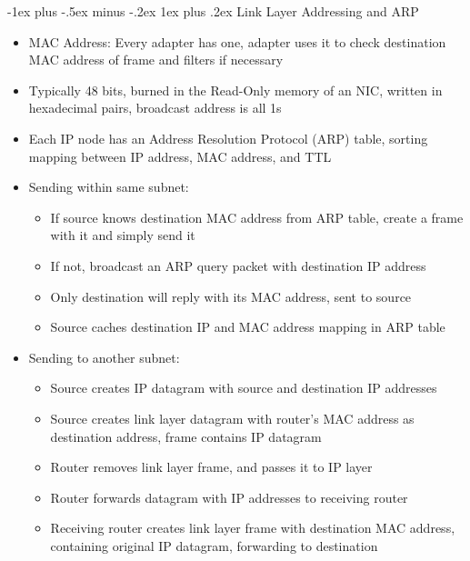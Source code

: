 \documentclass[10pt, landscape]{article}
\makeatletter
\renewcommand{\subsection}{\@startsection{subsection}{3}{0mm}%
                                {-1ex plus -.5ex minus -.2ex}%
                                {1ex plus .2ex}%
                                {\normalfont\small\bfseries}}%
\makeatother
\begin{document}
\begin{multicols*}{3}
\subsection{Link Layer Addressing and ARP}
\begin{itemize}
    \item MAC Address: Every adapter has one, adapter uses it to check destination MAC address of frame and filters if necessary
    \item Typically 48 bits, burned in the Read-Only memory of an NIC, written in hexadecimal pairs, broadcast address is all 1s
    \item Each IP node has an Address Resolution Protocol (ARP) table, sorting mapping between IP address, MAC address, and TTL
    \item Sending within same subnet:
    \begin{itemize}
        \item If source knows destination MAC address from ARP table, create a frame with it and simply send it
        \item If not, broadcast an ARP query packet with destination IP address
        \item Only destination will reply with its MAC address, sent to source
        \item Source caches destination IP and MAC address mapping in ARP table
    \end{itemize}
    \item Sending to another subnet:
    \begin{itemize}
        \item Source creates IP datagram with source and destination IP addresses
        \item Source creates link layer datagram with router's MAC address as destination address, frame contains IP datagram
        \item Router removes link layer frame, and passes it to IP layer
        \item Router forwards datagram with IP addresses to receiving router
        \item Receiving router creates link layer frame with destination MAC address, containing original IP datagram, forwarding to destination
    \end{itemize}
\end{itemize}


\end{multicols*}
\end{document}
